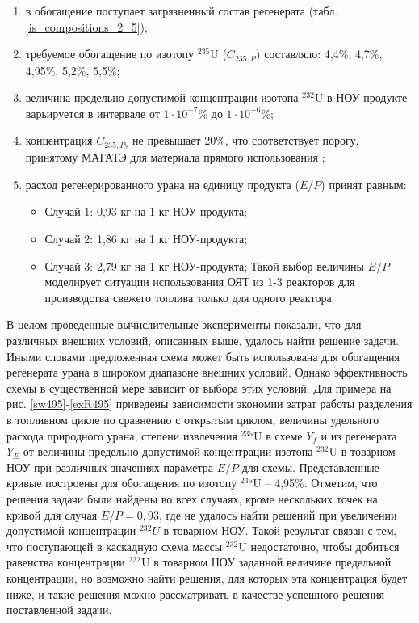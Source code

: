 \begin{enumerate}
    \item в обогащение поступает загрязненный состав регенерата (табл. \ref{is_compositions_2_5}); 
    \item требуемое обогащение по изотопу $^{235}$U ($C_{235,P}$) составляло: 4,4\%, 4,7\%, 4,95\%, 5,2\%, 5,5\%;    
    \item величина предельно допустимой концентрации изотопа $^{232}$U в НОУ-продукте варьируется в интервале от $1\cdot10^{-7}$\% до $1\cdot10^{-6}$\%;
    \item концентрация $C_{235,{P_2}}$ не превышает 20\%, что соответствует порогу, принятому МАГАТЭ для материала прямого использования \cite{alekseevConceptUseRecycled2010};
    \item расход регенерированного урана на единицу продукта ($E/P$) принят равным:
    \begin{itemize}
        \item Случай 1: 0,93 кг на 1 кг НОУ-продукта;
        \item Случай 2: 1,86 кг на 1 кг НОУ-продукта;
        \item Случай 3: 2,79 кг на 1 кг НОУ-продукта;        
        Такой выбор величины $E/P$ моделирует ситуации использования ОЯТ из 1-3 реакторов для производства свежего топлива только для одного реактора.
    \end{itemize}
\end{enumerate}

В целом проведенные вычислительные эксперименты показали, что для различных внешних условий, описанных выше, удалось найти решение задачи. Иными словами предложенная схема может быть использована для обогащения регенерата урана в широком диапазоне внешних условий. Однако эффективность схемы в существенной мере зависит от выбора этих условий. Для примера на рис. \ref{sw495}-\ref{exR495} приведены зависимости экономии затрат работы разделения в топливном цикле по сравнению с открытым циклом, величины удельного расхода природного урана, степени извлечения $^{235}$U в схеме $Y_f$ и из регенерата $Y_{E}$ от величины предельно допустимой концентрации изотопа $^{232}$U в товарном НОУ при различных значениях параметра $E/P$ для схемы. Представленные кривые построены для обогащения по изотопу $^{235}$U -- 4,95\%. Отметим, что решения задачи были найдены во всех случаях, кроме нескольких точек на кривой для случая $E/P=0,93$, где не удалось найти решений при увеличении допустимой концентрации $^{232}U$ в товарном НОУ. Такой результат связан с тем, что поступающей в каскадную схема массы $^{232}$U недостаточно, чтобы добиться равенства концентрации $^{232}$U в товарном НОУ заданной величине предельной концентрации, но возможно найти решения, для которых эта концентрация будет ниже, и такие решения можно рассматривать в качестве успешного решения поставленной задачи.

